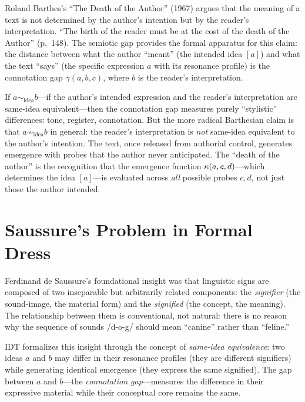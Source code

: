 \begin{interpretation}\label{interp:ch6:barthes_death_author}
Roland Barthes's ``The Death of the Author'' (1967) argues that the
meaning of a text is not determined by the author's intention but by the
reader's interpretation. ``The birth of the reader must be at the cost of
the death of the Author'' (p.~148). The semiotic gap provides the formal
apparatus for this claim: the distance between what the author ``meant''
(the intended idea $[a]$) and what the text ``says'' (the specific
expression $a$ with its resonance profile) is the connotation gap
$\gamma(a, b, c)$, where $b$ is the reader's interpretation.

If $a \sim_{\text{idea}} b$---if the author's intended expression and the
reader's interpretation are same-idea equivalent---then the connotation gap
measures purely ``stylistic'' differences: tone, register, connotation.
But the more radical Barthesian claim is that $a \not\sim_{\text{idea}} b$
in general: the reader's interpretation is \emph{not} same-idea equivalent
to the author's intention. The text, once released from authorial control,
generates emergence with probes that the author never anticipated. The
``death of the author'' is the recognition that the emergence function
$\kappa(a, c, d)$---which determines the idea $[a]$---is evaluated across
\emph{all} possible probes $c, d$, not just those the author intended.
\end{interpretation}

\section{Saussure's Problem in Formal Dress}

Ferdinand de Saussure's foundational insight was that linguistic signs are
composed of two inseparable but arbitrarily related components: the
\emph{signifier} (the sound-image, the material form) and the
\emph{signified} (the concept, the meaning). The relationship between
them is conventional, not natural: there is no reason why the sequence
of sounds /d-o-g/ should mean ``canine'' rather than ``feline.''

IDT formalizes this insight through the concept of \emph{same-idea
equivalence}: two ideas $a$ and $b$ may differ in their resonance profiles
(they are different signifiers) while generating identical emergence (they
express the same signified). The gap between $a$ and $b$---the
\emph{connotation gap}---measures the difference in their expressive
material while their conceptual core remains the same.

